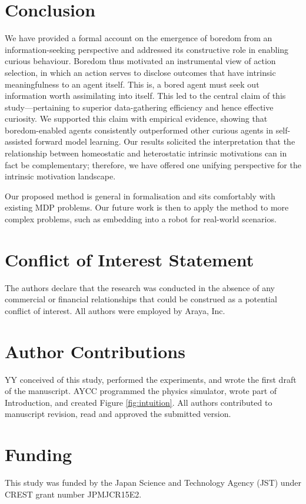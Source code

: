 \documentclass[utf8]{frontiersSCNS}
\begin{document}
\section{Conclusion}

We have provided a formal account on the emergence of boredom from an information-seeking perspective and addressed its constructive role in enabling curious behaviour. Boredom thus motivated an instrumental view of action selection, in which an action serves to disclose outcomes that have intrinsic meaningfulness to an agent itself. This is, a bored agent must seek out information worth assimilating into itself. This led to the central claim of this study---pertaining to superior data-gathering efficiency and hence effective curiosity. We supported this claim with empirical evidence, showing that boredom-enabled agents consistently outperformed other curious agents in self-assisted forward model learning. Our results solicited the interpretation that the relationship between homeostatic and heterostatic intrinsic motivations can in fact be complementary; therefore, we have offered one unifying perspective for the intrinsic motivation landscape.

Our proposed method is general in formalisation and sits comfortably with existing MDP problems. Our future work is then to apply the method to more complex problems, such as embedding into a robot for real-world scenarios.

\section*{Conflict of Interest Statement}

The authors declare that the research was conducted in the absence of any commercial or financial relationships that could be construed as a potential conflict of interest. All authors were employed by Araya, Inc.

\section*{Author Contributions}
YY conceived of this study, performed the experiments, and wrote the first draft of the manuscript. AYCC programmed the physics simulator, wrote part of Introduction, and created Figure \ref{fig:intuition}. All authors contributed to manuscript revision, read and approved the submitted version.

\section*{Funding}
This study was funded by the Japan Science and Technology Agency (JST) under CREST grant number JPMJCR15E2.
\end{document}
